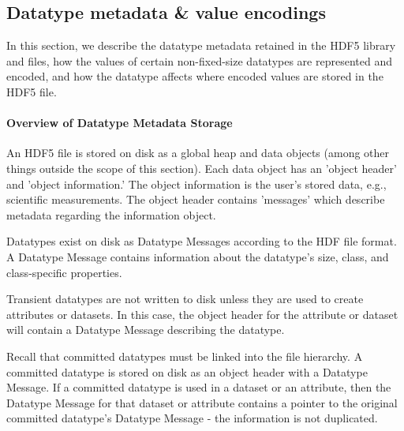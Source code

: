 \subsection{Datatype metadata \& value encodings}


In this section, we describe the datatype metadata retained in the HDF5 library and files, how the values of certain non-fixed-size datatypes are represented and encoded, and how the datatype affects where encoded values are stored in the HDF5 file.

\paragraph{Overview of Datatype Metadata Storage} An HDF5 file is stored on disk as a global heap and data objects (among other things outside the scope of this section). Each data object has an 'object header' and 'object information.' The object information is the user's stored data, e.g., scientific measurements. The object header contains 'messages' which describe metadata regarding the information object. 

Datatypes exist on disk as Datatype Messages according to the HDF file format. A Datatype Message contains information about the datatype's size, class, and class-specific properties.

Transient datatypes are not written to disk unless they are used to create attributes or datasets. In this case, the object header for the attribute or dataset will contain a Datatype Message describing the datatype.

Recall that committed datatypes must be linked into the file hierarchy. A committed datatype is stored on disk as an object header with a Datatype Message. If a committed datatype is used in a dataset or an attribute, then the Datatype Message for that dataset or attribute contains a pointer to the original committed datatype's Datatype Message - the information is not duplicated.



